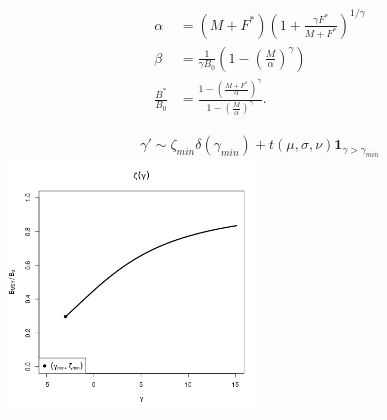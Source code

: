 \documentclass[ xcolor = pdftex, dvipsnames, table ]{beamer}
\begin{document}
%
\begin{frame}
\begin{align}
\alpha &= (M+F^*)\left(1+\frac{\gamma F^*}{M+F^*}\right)^{1/\gamma} \nonumber\\
\beta &= \frac{1}{\gamma B_0}\left(1-\left(\frac{M}{\alpha}\right)^\gamma\right) \label{abgSys}\\
\frac{B^*}{B_0} &= \frac{1-\left(\frac{M+F^*}{\alpha}\right)^\gamma}{ 1-\left(\frac{M}{\alpha}\right)^\gamma } \nonumber.
\end{align}
\end{frame}

%
\begin{frame}
\begin{align}
\gamma' \sim \zeta_{min}\delta(\gamma_{min}) + t(\mu, \sigma, \nu)\bm{1}_{\gamma>\gamma_{min}}
\end{align}
\includegraphics[width=0.5\textwidth]{../../gpBias/zeta.png}
\end{frame}
\end{document}
